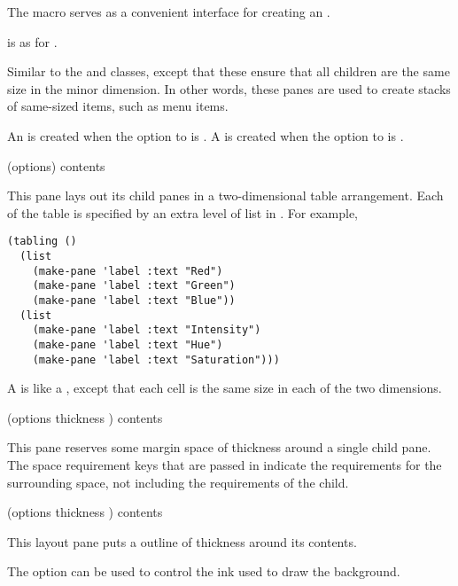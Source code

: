 The  macro serves as a convenient interface for creating an
.

 is as for .



Similar to the  and  classes, except that these
ensure that all children are the same size in the minor dimension.  In other
words, these panes are used to create stacks of same-sized items, such as menu
items.

An  is created when the  option to
 is .  A  is created when the
 option to  is .


 {(\rest options) \body contents}

This pane lays out its child panes in a two-dimensional table arrangement.  Each
of the table is specified by an extra level of list in .  For example,

\begin{verbatim}
(tabling ()
  (list
    (make-pane 'label :text "Red")
    (make-pane 'label :text "Green")
    (make-pane 'label :text "Blue"))
  (list
    (make-pane 'label :text "Intensity")
    (make-pane 'label :text "Hue")
    (make-pane 'label :text "Saturation")))
\end{verbatim}



A  is like a , except that each cell is the same
size in each of the two dimensions.


 {(\rest options \key thickness \allow) \body contents}

This pane reserves some margin space of thickness  around a
single child pane.  The space requirement keys that are passed in indicate the
requirements for the surrounding space, not including the requirements of the
child.


 {(\rest options \key thickness \allow) \body contents}

This layout pane puts a outline of thickness  around its contents.

The  option can be used to control the ink used to draw the
background.


